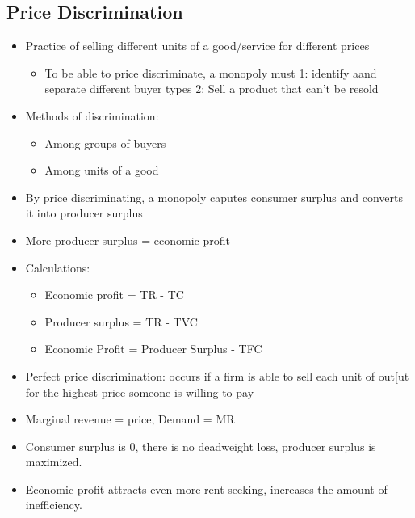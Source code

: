 \documentclass[11pt]{article}
\begin{document}
\subsection{Price Discrimination}
\label{sec:orgb0f2c3b}
\begin{itemize}
\item Practice of selling different units of a good/service for different prices
\begin{itemize}
\item To be able to price discriminate, a monopoly must
1: identify aand separate different buyer types
2: Sell a product that can't be resold
\end{itemize}
\item Methods of discrimination:
\begin{itemize}
\item Among groups of buyers
\item Among units of a good
\end{itemize}
\item By price discriminating, a monopoly caputes consumer surplus and converts it into producer surplus
\item More producer surplus = economic profit
\item Calculations:
\begin{itemize}
\item Economic profit = TR - TC
\item Producer surplus = TR - TVC
\item Economic Profit = Producer Surplus - TFC
\end{itemize}
\item Perfect price discrimination: occurs if a firm is able to sell each unit of out[ut for the highest price someone is willing to pay
\item Marginal revenue = price, Demand = MR
\item Consumer surplus is 0, there is no deadweight loss, producer surplus is maximized.
\item Economic profit attracts even more rent seeking, increases the amount of inefficiency.
\end{itemize}
\end{document}
